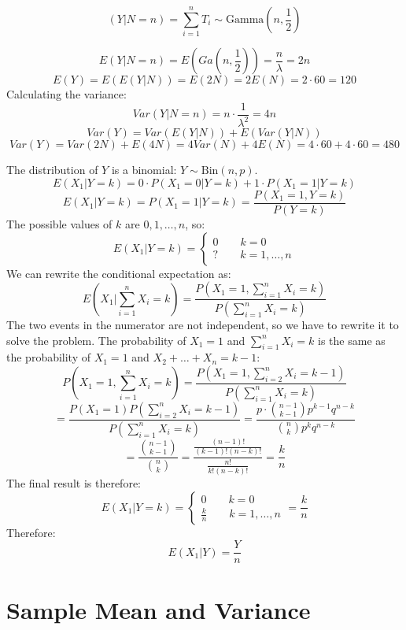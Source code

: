 \[
(Y|N = n) = \sum_{i=1}^{n} T_i \sim \text{Gamma}(n, \frac{1}{2})
\]

\[
E(Y|N=n) = E(Ga(n, \frac{1}{2})) = \frac{n}{\lambda} = 2n
\]
\[
E(Y) = E(E(Y|N)) = E(2N) = 2E(N) = 2 \cdot 60 = 120
\]
Calculating the variance:
\[
Var(Y|N=n) = n \cdot \frac{1}{\lambda^2} = 4n
\]
\[
Var(Y) = Var(E(Y|N)) + E(Var(Y|N))
\]
\[
Var(Y) = Var(2N) + E(4N) = 4Var(N) + 4E(N) = 4 \cdot 60 + 4 \cdot 60 = 480
\]


The distribution of $Y$ is a binomial: $Y \sim \text{Bin}(n, p)$.
\[
E(X_1 | Y = k) = 0 \cdot P(X_1 = 0 | Y = k) + 1 \cdot P(X_1 = 1 | Y = k)
\]
\[
E(X_1 | Y = k) = P(X_1 = 1 | Y = k) = \frac{P(X_1 = 1, Y = k)}{P(Y = k)}
\]
The possible values of $k$ are $0, 1, \ldots , n$, so:
\[
    E(X_1 | Y = k) = \begin{cases}
        0 \qquad k = 0 \\
        ? \qquad k = 1, \ldots , n
    \end{cases}
\]
We can rewrite the conditional expectation as:
\[
E\left(X_1 | \sum_{i=1}^{n} X_i = k\right) = \frac{P(X_1 = 1, \sum_{i=1}^{n} X_i = k)}{P(\sum_{i=1}^{n} X_i = k)}
\]
The two events in the numerator are not independent, so we have to rewrite it to solve the problem.
The probability of $X_1 = 1$ and $\sum_{i=1}^{n} X_i = k$ is the same as the probability of $X_1 = 1$ and $X_2 + \ldots + X_n = k-1$:
\[
P(X_1 = 1, \sum_{i=1}^{n} X_i = k) = \frac{P(X_1 = 1, \sum_{i=2}^{n} X_i = k-1)}{P(\sum_{i=1}^{n} X_i = k)}
\]
\[
= \frac{P(X_1 = 1)P(\sum_{i=2}^{n} X_i = k-1)}{P(\sum_{i=1}^{n} X_i = k)} = \frac{p\cdot \binom{n-1}{k-1}p^{k-1}q^{n-k}}{\binom{n}{k}p^kq^{n-k}}
\]
\[
= \frac{\binom{n-1}{k-1}}{\binom{n}{k}} = \frac{\frac{(n-1)!}{(k-1)!(n-k)!}}{\frac{n!}{k!(n-k)!}} = \frac{k}{n}
\]
The final result is therefore:
\[    
E(X_1 | Y = k) = \begin{cases}
    0 \qquad k = 0 \\
    \frac{k}{n} \qquad k = 1, \ldots , n
\end{cases}
= \frac{k}{n}
\]
Therefore:
\[
E(X_1 | Y) = \frac{Y}{n}
\]

\section{Sample Mean and Variance}


